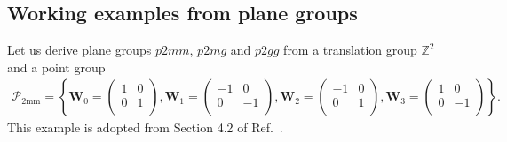 \subsection{Working examples from plane groups}

Let us derive plane groups $p2mm$, $p2mg$ and $p2gg$ from a translation group $\mathbb{Z}^{2}$ and a point group
\begin{align*}
  \mathcal{P}_{\mathrm{2mm}} = \left\{
    \bm{W}_{0} = \begin{pmatrix}
      1 & 0 \\
      0 & 1 \\
    \end{pmatrix},
    \bm{W}_{1} = \begin{pmatrix}
      -1 & 0 \\
      0 & -1 \\
    \end{pmatrix},
    \bm{W}_{2} = \begin{pmatrix}
      -1 & 0 \\
      0 & 1 \\
    \end{pmatrix},
    \bm{W}_{3} = \begin{pmatrix}
      1 & 0 \\
      0 & -1 \\
    \end{pmatrix}
  \right\}.
\end{align*}
This example is adopted from Section 4.2 of Ref.~\cite{Souvignier08}.

